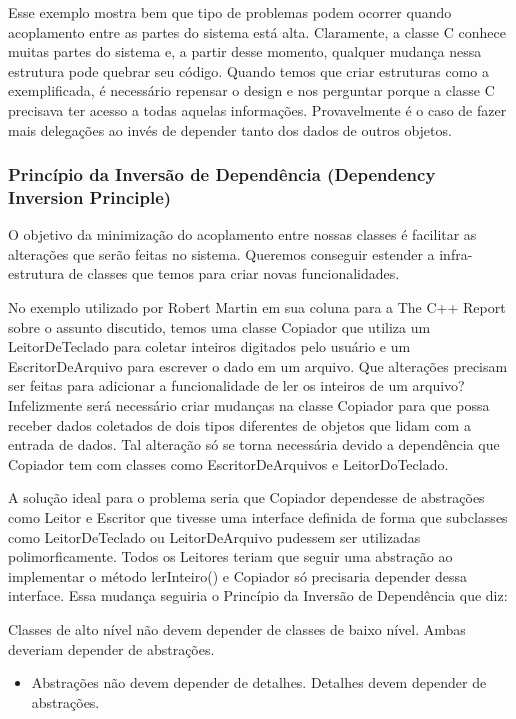 Esse exemplo mostra bem que tipo de problemas podem ocorrer quando acoplamento entre as partes do sistema está alta. Claramente, a classe C conhece muitas partes do sistema e, a partir desse momento, qualquer mudança nessa estrutura pode quebrar seu código. Quando temos que criar estruturas como a exemplificada, é necessário repensar o design e nos perguntar porque a classe C precisava ter acesso a todas aquelas informações. Provavelmente é o caso de fazer mais delegações ao invés de depender tanto dos dados de outros objetos.

\subsubsection{Princípio da Inversão de Dependência (Dependency Inversion Principle)}
O objetivo da minimização do acoplamento entre nossas classes é facilitar as alterações que serão feitas no sistema. Queremos conseguir estender a infra-estrutura de classes que temos para criar novas funcionalidades.
	
No exemplo utilizado por Robert Martin em sua coluna para a The C++ Report sobre o assunto discutido, temos uma classe Copiador que utiliza um LeitorDeTeclado para coletar inteiros digitados pelo usuário e um EscritorDeArquivo para escrever o dado em um arquivo. Que alterações precisam ser feitas  para adicionar a funcionalidade de ler os inteiros de um arquivo? Infelizmente será necessário criar mudanças na classe Copiador para que possa receber dados coletados de dois tipos diferentes de objetos que lidam com a entrada de dados. Tal alteração só se torna necessária devido a dependência que Copiador tem com classes como EscritorDeArquivos e LeitorDoTeclado.
	
A solução ideal para o problema seria que Copiador dependesse de abstrações como Leitor e Escritor que tivesse uma interface definida de forma que subclasses como LeitorDeTeclado ou LeitorDeArquivo pudessem ser utilizadas polimorficamente. Todos os Leitores teriam que seguir uma abstração ao implementar o método lerInteiro() e Copiador só precisaria depender dessa interface. Essa mudança seguiria o Princípio da Inversão de Dependência que diz:
	
Classes de alto nível não devem depender de classes de baixo nível. Ambas deveriam depender de abstrações.

\begin{itemize}
	\item Abstrações não devem depender de detalhes. Detalhes devem depender de abstrações.
\end{itemize}

